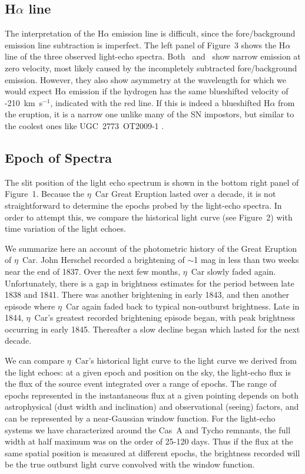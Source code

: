 \subsection{H$\alpha$ line}
The interpretation of the H$\alpha$ emission line is difficult, since
the fore/background emission line subtraction is imperfect. The
left panel of Figure~3
\ifcheck
\fi
shows the H$\alpha$ line of the three observed light-echo
spectra. Both
\specMlo\ and \specDP\ show narrow emission at zero velocity, most
likely caused by the incompletely subtracted fore/background
emission. However, they also show asymmetry at the wavelength for
which we would expect H$\alpha$ emission if the hydrogen has the same
blueshifted velocity of -210~km~s$^{-1}$, indicated with the red
line. If this is indeed a blueshifted H$\alpha$ from the eruption, it
is a narrow one unlike many of the SN impostors, but similar to the
coolest ones like UGC~2773~OT2009-1\cite{Smith10,Foley11}
.

\subsection{Epoch of Spectra}

The slit position of the light echo spectrum is shown in the bottom
right panel of Figure~1.
\ifcheck
\fi
Because the $\eta$~Car Great Eruption lasted over a decade, it is not
straightforward to determine the epochs probed by the light-echo
spectra. In order to attempt this, we compare the historical light
curve\cite{SF11} (see Figure~2)
\ifcheck
\fi
with time variation of the light echoes.

We summarize here an account\cite{SF11} of the photometric history of
the Great Eruption of $\eta$~Car.  John Herschel recorded a
brightening of $\sim$1 mag in less than two weeks near the end of
1837. Over the next few months, $\eta$~Car slowly faded
again. Unfortunately, there is a gap in brightness estimates for the
period between late 1838 and 1841.  There was another brightening in
early 1843, and then another episode where $\eta$~Car again faded back
to typical non-outburst brightness. Late in 1844, $\eta$~Car's
greatest recorded brightening episode began, with peak brightness
occurring in early 1845. Thereafter a slow decline began which lasted
for the next decade.

We can compare $\eta$~Car's historical light curve to the light curve
we derived from the light echoes: at a given epoch and position on the
sky, the light-echo flux is the flux of the source event integrated
over a range of epochs. The range of epochs represented in the
instantaneous flux at a given pointing depends on both astrophysical
(dust width and inclination) and observational (seeing) factors, and
can be represented by a near-Gaussian window
function\cite{Rest11_leprofile}. For the light-echo systems we have
characterized around the Cas~A and Tycho remnants, the full width at
half maximum was on the order of 25-120
days\cite{Rest11_leprofile}. Thus if the flux at the same spatial
position is measured at different epochs, the brightness recorded will
be the true outburst light curve convolved with the window function.

